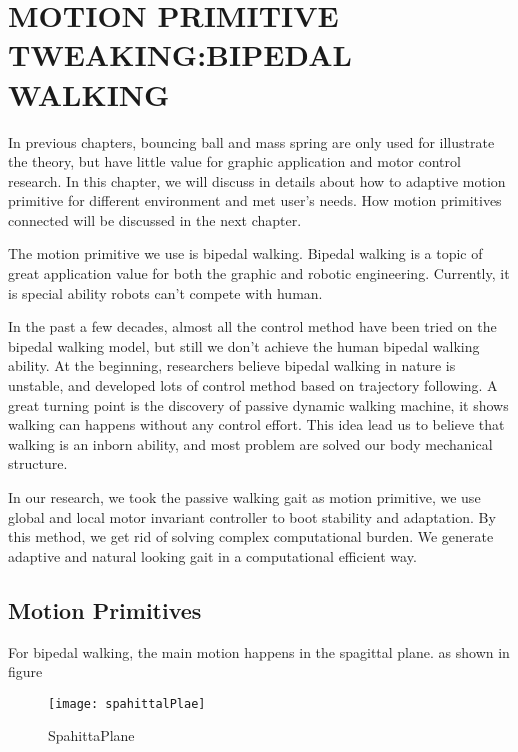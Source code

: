 \chapter{MOTION PRIMITIVE TWEAKING:BIPEDAL WALKING}
\label{chap:walk}

\ifpdf
    \graphicspath{{BipedWalk/BipedWalkFigs/PNG/}{BipedWalk/BipedWalkFigs/PDF/}{BipedWalk/BipedWalkFigs/}}
\else
    \graphicspath{{BipedWalk/BipedWalkFigs/EPS/}{BipedWalk/BipedWalkFigs/}}
\fi

In previous chapters, bouncing ball and mass spring are only used for illustrate the theory, but have little value for graphic application and motor control research.
In this chapter, we will discuss in details about how to adaptive motion primitive for different environment and met user's needs.
How motion primitives connected will be discussed in the next chapter.


The motion primitive we use is bipedal walking.
Bipedal walking is a topic of great application value for both the graphic and robotic engineering.
Currently, it is special ability robots can't compete with human.

In the past a few decades, almost all the control method have been tried on the bipedal walking model, but still we don't achieve the human bipedal walking ability.
At the beginning, researchers believe bipedal walking in nature is unstable, and developed lots of control method based on trajectory following.
A great turning point is the discovery of passive dynamic walking machine, it shows walking can happens without any control effort.
This idea lead us to believe that walking is an inborn ability, and most problem are solved our body mechanical structure.

In our research, we took the passive walking gait as motion primitive, we use global and local motor invariant controller to boot stability and adaptation.
By this method, we get rid of solving complex computational burden.
We generate adaptive and natural looking gait in a computational efficient way.


\section{Motion Primitives}


For bipedal walking, the main motion happens in the spagittal plane.
as shown in figure
\begin{figure}[!htbp]
  \begin{center}
      \texttt{[image: spahittalPlae]}
    \caption{SpahittaPlane}
    \label{fig:passivekneewalker}
\end{center}
\end{figure}



